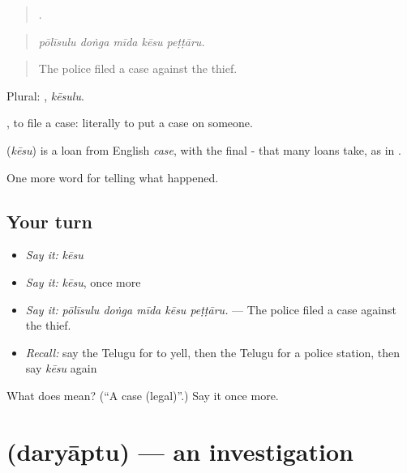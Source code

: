 \begin{quote}
    .
\end{quote}

\begin{quote}
\emph{pōlīsulu doṅga mīda kēsu peṭṭāru.}
\end{quote}

\begin{quote}
The police filed a case against the thief.
\end{quote}

Plural: , \emph{kēsulu}.

 , to file a case: literally to put a case on someone.

\begin{cousinweb}
\textbf{} (\emph{kēsu}) is a loan from English \emph{case}, with the final - that many loans take, as in .
\end{cousinweb}

\begin{grammarlens}[title={What you've built}]
One more word for telling what happened.
\end{grammarlens}

\subsection*{Your turn}
\begin{itemize}
\raggedright
  \item \emph{Say it:} \emph{kēsu}
  \item \emph{Say it:} \emph{kēsu}, once more
  \item \emph{Say it:} \emph{pōlīsulu doṅga mīda kēsu peṭṭāru.} — The police filed a case against the thief.
  \item \emph{Recall:} say the Telugu for to yell, then the Telugu for a police station, then say \emph{kēsu} again
\end{itemize}

\begin{tcolorbox}[breakable,colback=teal!4,colframe=teal!35!black,title={Before you move on}]
What does  mean? (\textquotedblleft{}A case (legal)\textquotedblright{}.) Say it once more.
\end{tcolorbox}
\section[\texorpdfstring{\te{దర్యాప్తు} (daryāptu)}{దర్యాప్తు (daryāptu)}]{ (daryāptu) — an investigation}

